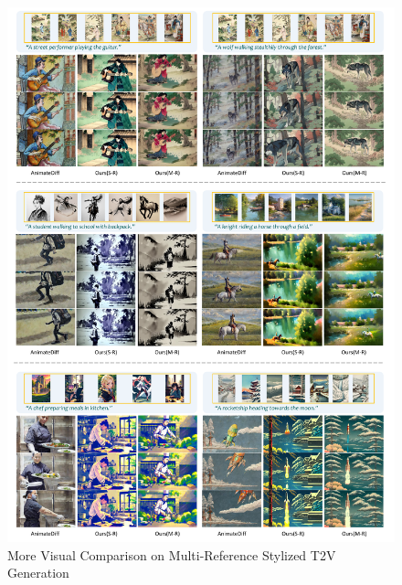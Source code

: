 \begin{figure}[t]
    \centering
    \vspace{-1.5em}
    \includegraphics[width=0.85\linewidth]{figures/supp/result_comp_multi_ref_vid.pdf}
    \vspace{-0.8em}
    \caption{More Visual Comparison on Multi-Reference Stylized T2V Generation} 
    \label{fig:supp_more_result_comp_multi}
\end{figure}



